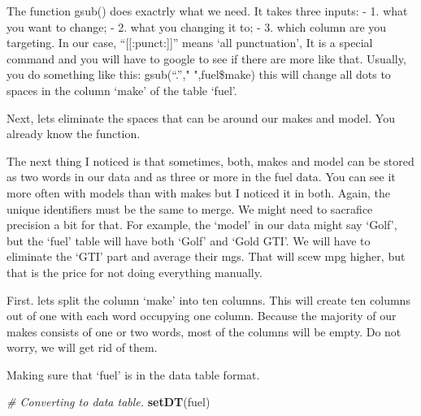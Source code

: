 \documentclass[]{book}
\newenvironment{Shaded}{\begin{snugshade}}{\end{snugshade}}
\newcommand{\CommentTok}[1]{\textcolor[rgb]{0.56,0.35,0.01}{\textit{#1}}}
\newcommand{\KeywordTok}[1]{\textcolor[rgb]{0.13,0.29,0.53}{\textbf{#1}}}
\newcommand{\NormalTok}[1]{#1}
\newcommand{\OperatorTok}[1]{\textcolor[rgb]{0.81,0.36,0.00}{\textbf{#1}}}
\newcommand{\StringTok}[1]{\textcolor[rgb]{0.31,0.60,0.02}{#1}}
\begin{document}
The function gsub() does exactrly what we need. It takes three inputs:
- 1. what you want to change;
- 2. what you changing it to;
- 3. which column are you targeting.
In our case, ``{[}{[}:punct:{]}{]}'' means `all punctuation', It is a special command and you will have to google to see if there are more like that. Usually, you do something like this: gsub(``.''," ",fuel\$make) this will change all dots to spaces in the column `make' of the table `fuel'.

Next, lets eliminate the spaces that can be around our makes and model. You already know the function.

\begin{Shaded}
\end{Shaded}

The next thing I noticed is that sometimes, both, makes and model can be stored as two words in our data and as three or more in the fuel data. You can see it more often with models than with makes but I noticed it in both. Again, the unique identifiers must be the same to merge. We might need to sacrafice precision a bit for that. For example, the `model' in our data might say `Golf', but the `fuel' table will have both `Golf' and `Gold GTI'. We will have to eliminate the `GTI' part and average their mgs. That will scew mpg higher, but that is the price for not doing everything manually.

First. lets split the column `make' into ten columns. This will create ten columns out of one with each word occupying one column. Because the majority of our makes consists of one or two words, most of the columns will be empty. Do not worry, we will get rid of them.

Making sure that `fuel' is in the data table format.

\begin{Shaded}
\begin{Highlighting}[]
\CommentTok{# Converting to data table.}
\KeywordTok{setDT}\NormalTok{(fuel)}
\end{Highlighting}
\end{Shaded}
\end{document}

